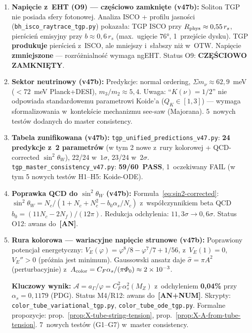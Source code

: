 \begin{remark}
\begin{enumerate}[nosep]
  \item \textbf{Napi\k{e}cie z~EHT (O9) --- cz\k{e}\'sciowo zamkni\k{e}te (v47b):}
    Soliton TGP nie posiada sfery fotonowej.
    Analiza ISCO + profilu jasno\'sci
    (\texttt{bh\_isco\_raytrace\_tgp.py}) pokaza\l{}a:
    TGP ISCO przy $R_{\rm phys} \approx 0{,}55\,r_s$,
    pier\'scie\'n emisyjny przy $b \approx 0{,}6\,r_s$ (max.\ ugięcie $76°$, 1~przej\'scie dysku).
    TGP \textbf{produkuje} pier\'scie\'n z~ISCO, ale mniejszy i~s\l{}abszy ni\.z w~OTW.
    Napi\k{e}cie \textbf{zmniejszone} --- rozr\'o\.znialno\'s\'c wymaga ngEHT.
    Status O9: \textbf{CZ\k{E}\'SCIOWO ZAMKNI\k{E}TY}.

  \item \textbf{Sektor neutrinowy (v47b):}
    Predykcje: normal ordering, $\Sigma m_\nu \approx 62{,}9$~meV
    ($< 72$~meV Planck+DESI), $m_3/m_2 \approx 5{,}4$.
    Uwaga: ``$K(\nu) = 1/2$'' nie odpowiada standardowemu
    parametrowi Koide'a ($Q_K \in [1,3]$) --- wymaga sformalizowania
    w~kontek\'scie mechanizmu see-saw (Majorana).
    5~nowych test\'ow dodanych do master consistency.

  \item \textbf{Tabela zunifikowana (v47b):}
    \texttt{tgp\_unified\_predictions\_v47.py}:
    \textbf{24 predykcje z~2 parametr\'ow} (w tym 2 nowe z~rury kolorowej + QCD-corrected $\sin^2\theta_W$),
    22/24 w~$1\sigma$, 23/24 w~$2\sigma$.
    \texttt{tgp\_master\_consistency\_v47.py}:
    \textbf{59/60~PASS}, 1~oczekiwany FAIL
    (w tym 5 nowych test\'ow H1--H5: Koide-ODE).

  \item \textbf{Poprawka QCD do $\sin^2\theta_W$ (v47b):}
    Formu\l{}a~\eqref{eq:sin2-corrected}: $\sin^2\theta_W
    = N_c/(1+N_c+N_c^2 - b_0\alpha_s/N_c)$ z~wsp\'o\l{}czynnikiem
    beta QCD $b_0 = (11N_c{-}2N_f)/(12\pi)$.
    Redukcja odchylenia: \textbf{$11{,}3\sigma \to 0{,}6\sigma$}.
    Status O12: awans do~\textbf{[AN]}.

  \item \textbf{Rura kolorowa --- wariacyjne napi\k{e}cie strunowe (v47b):}
    Poprawiony potencja\l{} energetyczny:
    $V_E(\varphi) = \varphi^8/8 - \varphi^7/7 + 1/56$,
    z~$V_E(1) = 0$, $V_E'' > 0$ (pr\'o\.znia jest minimum).
    Gaussowski ansatz daje $\hat\sigma = \pi A^2$ (perturbacyjnie)
    z~$A_{\rm color} = C_F\alpha_s/(\pi\varPhi_0) \approx 2 \times 10^{-3}$.

    \textbf{Kluczowy wynik:}
    $\mathcal{A} = a_\Gamma/\varphi = C_F^2\,\alpha_s^2(M_Z)$
    z~odchyleniem \textbf{0{,}04\%} przy $\alpha_s = 0{,}1179$ (PDG).
    Status M4/R12: awans do~\textbf{[AN+NUM]}.
    Skrypty: \texttt{color\_tube\_variational\_tgp.py},
    \texttt{color\_tube\_ode\_tgp.py}.
    Formalne propozycje: prop.~\ref{prop:X-tube-string-tension},
    prop.~\ref{prop:X-A-from-tube-tension}.
    7~nowych test\'ow (G1--G7) w~master consistency.


\end{enumerate}
\end{remark}
